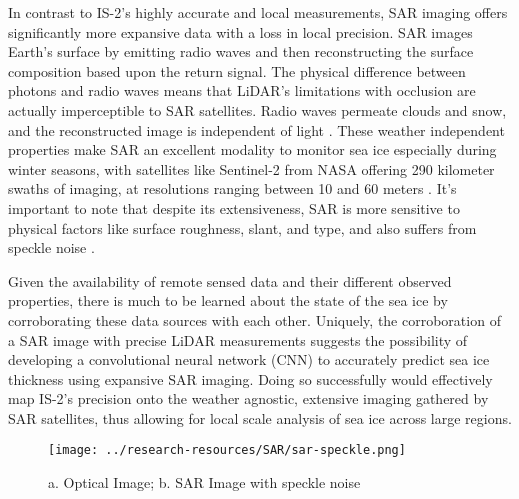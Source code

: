 In contrast to IS-2's highly accurate and local measurements, SAR imaging offers significantly more expansive data with a loss in local precision. SAR images Earth's surface by emitting radio waves and then reconstructing the surface composition based upon the return signal. The physical difference between photons and radio waves means that LiDAR's limitations with occlusion are actually imperceptible to SAR satellites. Radio waves permeate clouds and snow, and the reconstructed image is independent of light \cite{SAR-Info}. These weather independent properties make SAR an excellent modality to monitor sea ice especially during winter seasons, with satellites like Sentinel-2 from NASA offering 290 kilometer swaths of imaging, at resolutions ranging between 10 and 60 meters \cite{Sentinel-2-Availability}. It's important to note that despite its extensiveness, SAR is more sensitive to physical factors like surface roughness, slant, and type, and also suffers from speckle noise \cite{SAR-Info}. 

\indent Given the availability of remote sensed data and their different observed properties, there is much to be learned about the state of the sea ice by corroborating these data sources with each other. Uniquely, the corroboration of a SAR image with precise LiDAR measurements suggests the possibility of developing a convolutional neural network (CNN) to accurately predict sea ice thickness using expansive SAR imaging. Doing so successfully would effectively map IS-2's precision onto the weather agnostic, extensive imaging gathered by SAR satellites, thus allowing for local scale analysis of sea ice across large regions.

\begin{figure}
	\hfill\begin{minipage}{.5\textwidth}\centering
	 \texttt{[image: ../research-resources/SAR/sar-speckle.png]}
	 \caption{a. Optical Image; b. SAR Image with speckle noise}
	\end{minipage}
 \end{figure}



